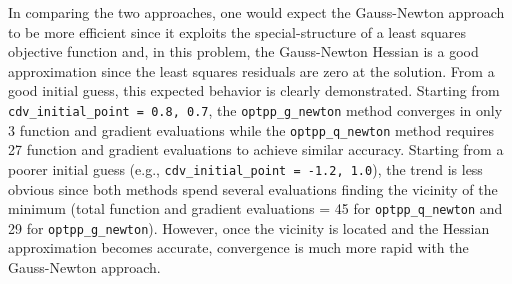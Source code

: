 In comparing the two approaches, one would expect the Gauss-Newton
approach to be more efficient since it exploits the special-structure
of a least squares objective function and, in this problem, the
Gauss-Newton Hessian is a good approximation since the least squares
residuals are zero at the solution.  From a good initial guess, this
expected behavior is clearly demonstrated. Starting from
\texttt{cdv\_initial\_point = 0.8, 0.7}, the \texttt{optpp\_g\_newton}
method converges in only 3 function and gradient evaluations while the
\texttt{optpp\_q\_newton} method requires 27 function and gradient
evaluations to achieve similar accuracy. Starting from a poorer
initial guess (e.g., \texttt{cdv\_initial\_point = -1.2, 1.0}), the
trend is less obvious since both methods spend several evaluations
finding the vicinity of the minimum (total function and gradient
evaluations = 45 for \texttt{optpp\_q\_newton} and 29 for
\texttt{optpp\_g\_newton}).  However, once the vicinity is located and
the Hessian approximation becomes accurate, convergence is much more
rapid with the Gauss-Newton approach.


